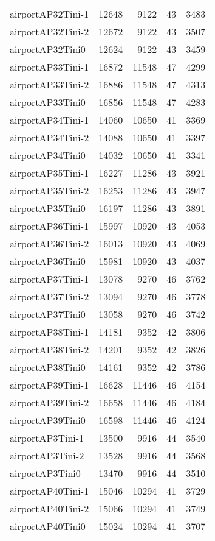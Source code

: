 \begin{longtable}{lrrrr}
airportAP32Tini-1 & 12648 & 9122 & 43 & 3483 \\
airportAP32Tini-2 & 12672 & 9122 & 43 & 3507 \\
airportAP32Tini0 & 12624 & 9122 & 43 & 3459 \\
airportAP33Tini-1 & 16872 & 11548 & 47 & 4299 \\
airportAP33Tini-2 & 16886 & 11548 & 47 & 4313 \\
airportAP33Tini0 & 16856 & 11548 & 47 & 4283 \\
airportAP34Tini-1 & 14060 & 10650 & 41 & 3369 \\
airportAP34Tini-2 & 14088 & 10650 & 41 & 3397 \\
airportAP34Tini0 & 14032 & 10650 & 41 & 3341 \\
airportAP35Tini-1 & 16227 & 11286 & 43 & 3921 \\
airportAP35Tini-2 & 16253 & 11286 & 43 & 3947 \\
airportAP35Tini0 & 16197 & 11286 & 43 & 3891 \\
airportAP36Tini-1 & 15997 & 10920 & 43 & 4053 \\
airportAP36Tini-2 & 16013 & 10920 & 43 & 4069 \\
airportAP36Tini0 & 15981 & 10920 & 43 & 4037 \\
airportAP37Tini-1 & 13078 & 9270 & 46 & 3762 \\
airportAP37Tini-2 & 13094 & 9270 & 46 & 3778 \\
airportAP37Tini0 & 13058 & 9270 & 46 & 3742 \\
airportAP38Tini-1 & 14181 & 9352 & 42 & 3806 \\
airportAP38Tini-2 & 14201 & 9352 & 42 & 3826 \\
airportAP38Tini0 & 14161 & 9352 & 42 & 3786 \\
airportAP39Tini-1 & 16628 & 11446 & 46 & 4154 \\
airportAP39Tini-2 & 16658 & 11446 & 46 & 4184 \\
airportAP39Tini0 & 16598 & 11446 & 46 & 4124 \\
airportAP3Tini-1 & 13500 & 9916 & 44 & 3540 \\
airportAP3Tini-2 & 13528 & 9916 & 44 & 3568 \\
airportAP3Tini0 & 13470 & 9916 & 44 & 3510 \\
airportAP40Tini-1 & 15046 & 10294 & 41 & 3729 \\
airportAP40Tini-2 & 15066 & 10294 & 41 & 3749 \\
airportAP40Tini0 & 15024 & 10294 & 41 & 3707 \\

\end{longtable}
